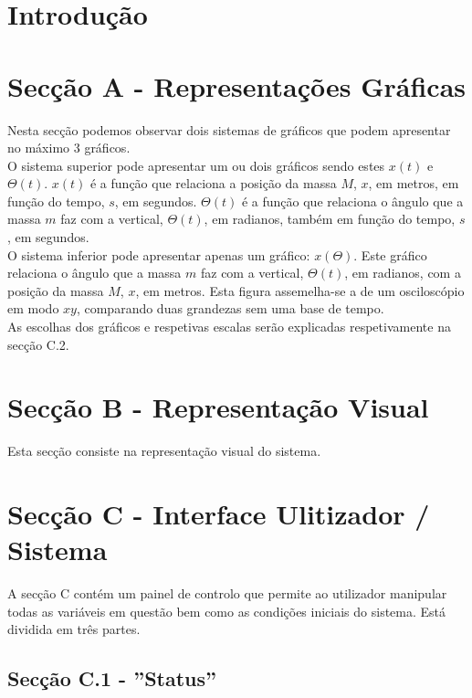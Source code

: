 \documentclass[12pt]{article}
\begin{document}
\section*{Introdu\c{c}\~ao}

\section{Sec\c{c}\~ao A - Representa\c{c}\~oes Gr\'aficas}

{
Nesta sec\c{c}\~ao podemos observar dois sistemas de gr\'aficos que podem apresentar no m\'aximo 3 gr\'aficos.
\\
O sistema superior pode apresentar um ou dois gr\'aficos sendo estes $x(t)$ e $\Theta(t)$. $x(t)$ \'e a fun\c{c}\~ao que relaciona a posi\c{c}\~ao da massa $M$, $x$, em metros, em fun\c{c}\~ao do tempo, $s$, em segundos. $\Theta(t)$ \'e a fun\c{c}\~ao que relaciona o \^angulo que a massa $m$ faz com a vertical, $\Theta(t)$, em radianos, também em fun\c{c}\~ao do tempo, $s$, em segundos.
\\
O sistema inferior pode apresentar apenas um gr\'afico: $x(\Theta)$. Este gr\'afico relaciona o \^angulo que a massa $m$ faz com a vertical, $\Theta(t)$, em radianos, com a posi\c{c}\~ao da massa $M$, $x$, em metros. Esta figura assemelha-se a de um oscilosc\'opio em modo $xy$, comparando duas grandezas sem uma base de tempo.
\\
As escolhas dos gráficos e respetivas escalas ser\~ao explicadas respetivamente na sec\c{c}\~ao C.2.
}

\section{Sec\c{c}\~ao B - Representa\c{c}\~ao Visual}

{
Esta sec\c{c}\~ao consiste na representa\c{c}\~ao visual do sistema.
}

\section{Sec\c{c}\~ao C - Interface Ulitizador / Sistema}

{
A sec\c{c}\~ao C cont\'em um painel de controlo que permite ao utilizador manipular todas as vari\'aveis em quest\~ao bem como as condi\c{c}\~oes iniciais do sistema. Est\'a dividida em tr\^es partes.
}

\subsection{Sec\c{c}\~ao C.1 - ''Status''}
\end{document}
